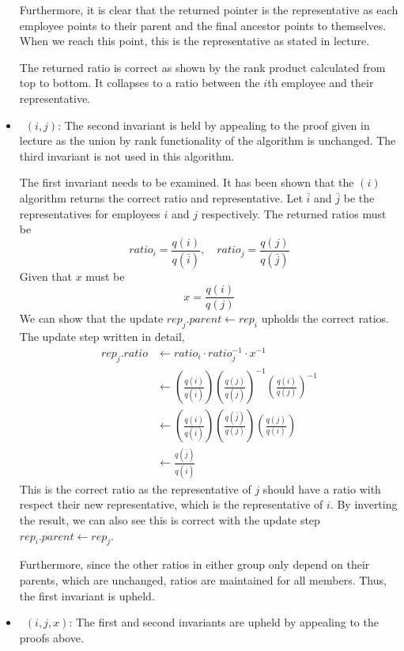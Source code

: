 \documentclass[12pt,twoside]{article}
\begin{document}
\begin{problems}
\begin{itemize}
        Furthermore, it is clear that the returned pointer is the representative
        as each employee points to their parent and the final ancestor points
        to themselves. When we reach this point, this is the representative as
        stated in lecture.
        
        The returned ratio is correct as shown by the rank product 
        calculated from top to bottom. It collapses to a ratio between the $i$th
        employee and their representative.
    \item\ $(i, j)$: The second invariant is held by appealing to
        the proof given in lecture as the union by rank functionality of the
        algorithm is unchanged. The third invariant is not used in this algorithm.
        
        The first invariant needs to be examined. It has been shown that the 
        $(i)$ algorithm returns the correct ratio and
        representative. Let $\bar{i}$ and $\bar{j}$ be the representatives for
        employees $i$ and $j$ respectively. The returned ratios must be
        $$ ratio_i = \frac{q(i)}{q(\bar{i})},\quad ratio_j = \frac{q(j)}{q(
        \bar{j})} $$
        Given that $x$ must be
        $$ x = \frac{q(i)}{q(j)} $$
        We can show that the update $rep_j.parent \leftarrow rep_i$ upholds the 
        correct ratios. The update step written in detail,
        \begin{align*}
            rep_j.ratio &\leftarrow ratio_i \cdot ratio_j^{-1} \cdot x^{-1} \\
            &\leftarrow \left(\frac{q(i)}{q(\bar{i})}\right) \left(
            \frac{q(j)}{q(\bar{j})}\right)^{-1} \left(\frac{q(i)}{q(j)}
            \right)^{-1} \\
            &\leftarrow \left(\frac{q(i)}{q(\bar{i})}\right) \left(
            \frac{q(\bar{j})}{q(j)}\right) \left(\frac{q(j)}{q(i)}
            \right) \\
            &\leftarrow \frac{q(\bar{j})}{q(\bar{i})}
        \end{align*}
        This is the correct ratio as the representative of $j$ should have a 
        ratio with respect their new representative, which is the representative
        of $i$. By inverting the result, we can also see this is correct with 
        the update step $rep_i.parent \leftarrow rep_j$. 
        
        Furthermore, since the other ratios in either group only depend on their
        parents, which are unchanged, ratios are maintained for all members. 
        Thus, the first invariant is upheld.
    \item\ $(i, j, x)$: The first and second invariants are 
        upheld by appealing to the proofs above.
        

\end{itemize}
\end{problems}
\end{document}
